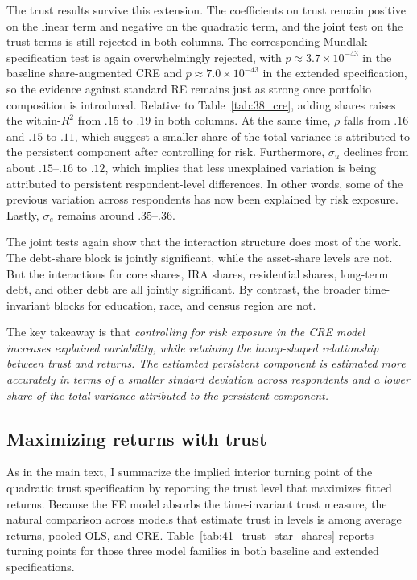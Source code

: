 \par The trust results survive this extension. The coefficients on trust remain positive on the linear term and negative on the quadratic term, and the joint test on the trust terms is still rejected in both columns. The corresponding Mundlak specification test is again overwhelmingly rejected, with $p \approx 3.7\times 10^{-43}$ in the baseline share-augmented CRE and $p \approx 7.0\times 10^{-43}$ in the extended specification, so the evidence against standard RE remains just as strong once portfolio composition is introduced. Relative to Table~\ref{tab:38_cre}, adding shares raises the within-$R^2$ from $.15$ to $.19$ in both columns. At the same time, $\rho$ falls from $.16$ and $.15$ to $.11$, which suggest a smaller share of the total variance is attributed to the persistent component after controlling for risk. Furthermore, $\sigma_u$ declines from about $.15$--$.16$ to $.12$, which implies that less unexplained variation is being attributed to persistent respondent-level differences. In other words, some of the previous variation across respondents has now been explained by risk exposure. Lastly, $\sigma_e$ remains around $.35$--$.36$.

\par The joint tests again show that the interaction structure does most of the work. The debt-share block is jointly significant, while the asset-share levels are not. But the interactions for core shares, IRA shares, residential shares, long-term debt, and other debt are all jointly significant. By contrast, the broader time-invariant blocks for education, race, and census region are not.

\par The key takeaway is that \textit{controlling for risk exposure in the CRE model increases explained variability, while retaining the hump-shaped relationship between trust and returns. The estiamted persistent component is estimated more accurately in terms of a smaller stndard deviation across respondents and a lower share of the total variance attributed to the persistent component.}

\subsection{Maximizing returns with trust}

\par As in the main text, I summarize the implied interior turning point of the quadratic trust specification by reporting the trust level that maximizes fitted returns. Because the FE model absorbs the time-invariant trust measure, the natural comparison across models that estimate trust in levels is among average returns, pooled OLS, and CRE. Table~\ref{tab:41_trust_star_shares} reports turning points for those three model families in both baseline and extended specifications.

